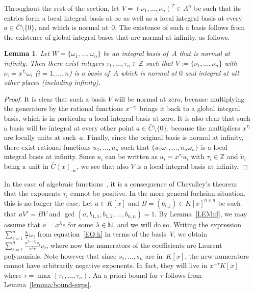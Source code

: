 \documentclass[final,1p,times,authoryear]{elsarticle}
\newtheorem{lemma}[theorem]{Lemma}
\let\set\mathbb
\begin{document}
Throughout the rest of the section, let $V = (\nu_1, \ldots, \nu_n)^T\in A^n$ be such that its entries
form a local integral basis at $\infty$ as well as a local integral basis at every $a\in\bar C\setminus\{0\}$,
and which is normal at~$0$.
The existence of such a basis follows from the existence of global integral bases that are normal at infinity,
as follows.

\begin{lemma}\label{LM:CB}
Let $W =\{\omega_1, \ldots, \omega_n\}$ be an integral basis of~$A$ that is normal at infinity. Then
there exist integers $\tau_1, \ldots, \tau_n\in\set Z$ such that
$V := \{\nu_1, \ldots, \nu_n\}$ with $\nu_i = x^{\tau_i} \omega_i$ ($i=1,\dots,n$)
is a basis of~$A$ which is normal at $0$ and integral at all other places (including infinity).
\end{lemma}
\begin{proof}
It is clear that such a basis $V$ will be normal at zero, because multiplying the generators by
the rational functions $x^{-\tau_i}$ brings it back to a global integral basis, which is in particular
a local integral basis at zero.
It is also clear that such a basis will be integral at every other point $a\in\bar C\setminus\{0\}$, because the
multipliers $x^{\tau_i}$ are locally units at such~$a$.
Finally, since the original basis is normal at infinity, there exist rational functions $u_1,\dots,u_n$
such that $\{u_1\omega_1,\dots,u_n\omega_n\}$ is a local integral basis at infinity.
Since $u_i$ can be written as $u_i=x^{\tau_i}\tilde{u}_i$ with $\tau_i\in\set Z$ and $\tilde{u}_i$ being a unit
in $\bar{C}(x)_\infty$, we see that also $V$ is a local integral basis at infinity.
\end{proof}

In the case of algebraic functions~\citep{chen16}, it is a consequence of Chevalley's theorem that the exponents
$\tau_i$ cannot be positive. In the more general fuchsian situation, this is no longer the case. 
Let $a\in K[x]$ and $B = (b_{i, j})\in K[x]^{n \times n}$ be such that $aV'=BV$ and
$\gcd(a, b_{1, 1}, b_{1, 2}, \ldots, b_{n ,n})=1$. By Lemma~\ref{LEM:d}, we may assume that
$a=x^\lambda e$ for some $\lambda\in\set N$, and we will do so. Writing the expression
$\sum_{i=1}^n\frac{s_i}{e}\omega_i$ from equation~\eqref{EQ:h} in terms of the basis~$V$,
we obtain $\sum_{i=1}^n\frac{x^{\lambda-\tau_i}s_i}{x^\lambda e}\nu_i$, where now
the numerators of the coefficients are Laurent polynomials. Note however that since
$s_1,\dots,s_n$ are in~$K[x]$, the new numerators cannot have arbitrarily negative exponents.
In fact, they will live in $x^{-\tau}K[x]$ where $\tau=\max(\tau_1,\dots,\tau_n)$.
An a priori bound for $\tau$ follows from Lemma~\ref{lemma:bound-exps}.
\end{document}
